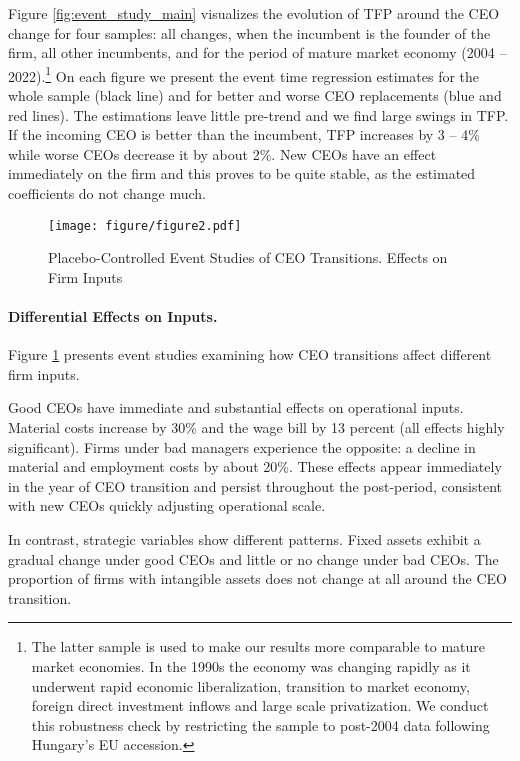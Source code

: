\documentclass[11pt,a4paper]{article}
\begin{document}
Figure \ref{fig:event_study_main} visualizes the evolution of TFP around the CEO change for four samples: all changes, when the incumbent is the founder of the firm, all other incumbents, and for the period of mature market economy (2004 -- 2022).\footnote{The latter sample is used to make our results more comparable to mature market economies. In the 1990s the economy was changing rapidly as it underwent rapid economic liberalization, transition to market economy, foreign direct investment inflows and large scale privatization. We conduct this robustness check by restricting the sample to post-2004 data following Hungary's EU accession.} On each figure we present the event time regression estimates for the whole sample (black line) and for better and worse CEO replacements (blue and red lines). The estimations leave little pre-trend and we find large swings in TFP. If the incoming CEO is better than the incumbent, TFP increases by 3 -- 4\% while worse CEOs decrease it by about 2\%. New CEOs have an effect immediately on the firm and this proves to be quite stable, as the estimated coefficients do not change much.  

\begin{figure}[htbp]
\centering
\texttt{[image: figure/figure2.pdf]}
\caption{Placebo-Controlled Event Studies of CEO Transitions. Effects on Firm Inputs}
\label{fig:event_study_input}
\end{figure}

\paragraph{Differential Effects on Inputs.} Figure \ref{fig:event_study_input} presents event studies examining how CEO transitions affect different firm inputs.

Good CEOs have immediate and substantial effects on operational inputs. Material costs increase by 30\% and the wage bill by 13 percent (all effects highly significant). Firms under bad managers experience the opposite: a decline in material and employment costs by about 20\%. These effects appear immediately in the year of CEO transition and persist throughout the post-period, consistent with new CEOs quickly adjusting operational scale.

In contrast, strategic variables show different patterns. Fixed assets exhibit a gradual change under good CEOs and little or no change under bad CEOs. The proportion of firms with intangible assets does not change at all around the CEO transition.
\end{document}
